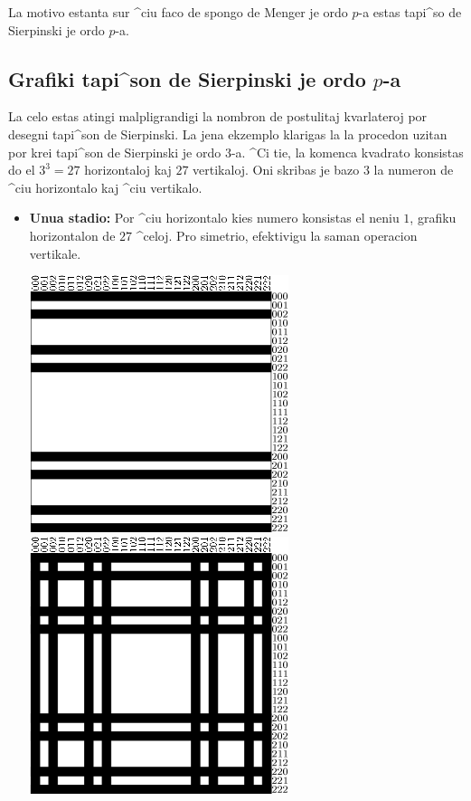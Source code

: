 La motivo estanta sur ^ciu faco de spongo de Menger je ordo $p$-a
estas tapi^so de Sierpinski je ordo $p$-a.

\subsection{Grafiki tapi^son de Sierpinski je ordo $p$-a}

La celo estas atingi malpligrandigi la nombron de postulitaj kvarlateroj
por desegni tapi^son de Sierpinski.  La jena ekzemplo klarigas la la
procedon uzitan por krei tapi^son de Sierpinski je ordo $3$-a.  ^Ci
tie, la komenca kvadrato konsistas do el $3^3=27$ horizontaloj kaj
$27$ vertikaloj.  Oni skribas je bazo $3$ la numeron de ^ciu
horizontalo kaj ^ciu vertikalo.

\begin{itemize}
\item [\textbullet]\textbf{Unua stadio:} Por ^ciu horizontalo kies
  numero konsistas el neniu $1$, grafiku horizontalon de $27$ ^celoj.
  Pro simetrio, efektivigu la saman operacion vertikale.
\begin{center}
\includegraphics{bildoj/menger-schema02.png}
\includegraphics{bildoj/menger-schema03.png}

\end{center}
\end{itemize}
